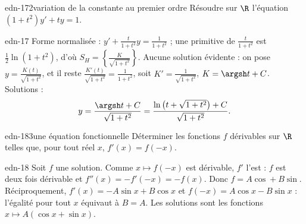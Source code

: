 \begin{exo}{edn-17}{2}{variation de la constante au premier ordre}
Résoudre sur $\R$ l'équation $(1+t^2)y'+ty=1$.
\end{exo}
\begin{corrige}{edn-17}
Forme normalisée : $y'+\frac t{1+t^2}y=\frac1{1+t^2}$ ; une primitive de $\frac t{1+t^2}$ est $\frac12\ln(1+t^2)$, d'où
$S_H=\left\{\frac K{\sqrt{1+t^2}}\right\}$. Aucune solution évidente : on pose $y=\frac{K(t)}{\sqrt{1+t^2}}$, et il reste
$\frac{K'(t)}{\sqrt{1+t^2}}=\frac1{1+t^2}$, soit $K'=\frac1{\sqrt{1+t^2}}$, $K=\argsh t+C$. Solutions :
\[y=\frac{\argsh t+C}{\sqrt{1+t^2}}=\frac{\ln\big(t+\sqrt{1+t^2}\big)+C}{\sqrt{1+t^2}}.\]
\end{corrige}

\begin{exo}{edn-18}{3}{une équation fonctionnelle}
Déterminer les fonctions $f$ dérivables sur $\R$ telles que, pour tout réel $x$, $f'(x)=f(-x)$.
\end{exo}
\begin{corrige}{edn-18}
Soit $f$ une solution. Comme $x\mapsto f(-x)$ est dérivable, $f'$ l'est : $f$ est deux fois dérivable et
$f''(x)=-f'(-x)=-f(x)$. Donc $f=A\cos+B\sin$. Réciproquement, $f'(x)=-A\sin x+B\cos x$ et $f(-x)=A\cos x-B\sin x$ :
l'égalité pour tout $x$ équivaut à $B=A$. Les solutions sont les fonctions $x\mapsto A(\cos x+\sin x)$.
\end{corrige}
